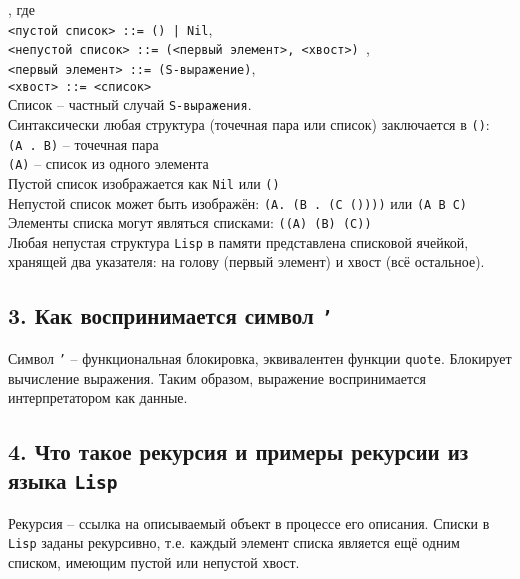 , где\\
{\texttt{<пустой список> ::= () | Nil}},\\
{\texttt{<непустой список> ::= (<первый элемент>, <хвост>) }},\\
{\texttt{<первый элемент> ::= (S-выражение)}},\\
{\texttt{<хвост> ::= <список>}}\\

\noindent Список -- частный случай {\texttt{S-выражения}}.\\
Синтаксически любая структура (точечная пара или список) заключается в {\texttt{()}}:\\
{\texttt{(A . B)}} -- точечная пара\\
{\texttt{(A)}} -- список из одного элемента\\
Пустой список изображается как {\texttt{Nil}} или {\texttt{()}}\\
Непустой список может быть изображён: {\texttt{(A. (B . (C ())))}} или {\texttt{(A B C)}}\\
Элементы списка могут являться списками: {\texttt{((A) (B) (C))}}\\
Любая непустая структура {\texttt{Lisp}} в памяти представлена списковой ячейкой, хранящей два указателя: на голову (первый элемент) и хвост (всё остальное).

\subsection*{3. Как воспринимается символ {\texttt{'}}}

Символ {\texttt{'}} -- функциональная блокировка, эквивалентен функции {\texttt{quote}}. Блокирует вычисление выражения. Таким образом, выражение воспринимается интерпретатором как данные.

\subsection*{4. Что такое рекурсия и примеры рекурсии из языка {\texttt{Lisp}}}

Рекурсия -- ссылка на описываемый объект в процессе его описания. Списки в {\texttt{Lisp}} заданы рекурсивно, т.е. каждый элемент списка является ещё одним списком, имеющим пустой или непустой хвост.